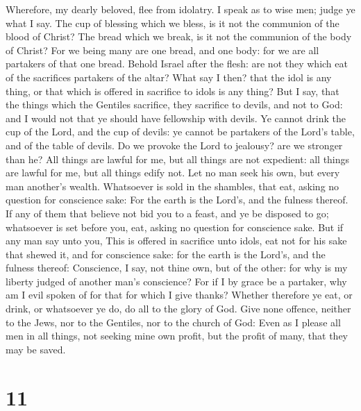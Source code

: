  Wherefore, my dearly beloved, flee from idolatry.
 I speak as to wise men; judge ye what I say. 
The cup of blessing which we bless, is it not the communion of the blood
of Christ? The bread which we break, is it not the communion of the body
of Christ?  For we being many are one bread, and one body:
for we are all partakers of that one bread.  Behold Israel
after the flesh: are not they which eat of the sacrifices partakers of
the altar?  What say I then? that the idol is any thing, or
that which is offered in sacrifice to idols is any thing? 
But I say, that the things which the Gentiles sacrifice, they sacrifice
to devils, and not to God: and I would not that ye should have
fellowship with devils.  Ye cannot drink the cup of the
Lord, and the cup of devils: ye cannot be partakers of the Lord's table,
and of the table of devils.  Do we provoke the Lord to
jealousy? are we stronger than he?  All things are lawful
for me, but all things are not expedient: all things are lawful for me,
but all things edify not.  Let no man seek his own, but
every man another's wealth.  Whatsoever is sold in the
shambles, that eat, asking no question for conscience sake:
 For the earth is the Lord's, and the fulness thereof.
 If any of them that believe not bid you to a feast, and ye
be disposed to go; whatsoever is set before you, eat, asking no question
for conscience sake.  But if any man say unto you, This is
offered in sacrifice unto idols, eat not for his sake that shewed it,
and for conscience sake: for the earth is the Lord's, and the fulness
thereof:  Conscience, I say, not thine own, but of the
other: for why is my liberty judged of another man's conscience?
 For if I by grace be a partaker, why am I evil spoken of
for that for which I give thanks?  Whether therefore ye
eat, or drink, or whatsoever ye do, do all to the glory of God.
 Give none offence, neither to the Jews, nor to the
Gentiles, nor to the church of God:  Even as I please all
men in all things, not seeking mine own profit, but the profit of many,
that they may be saved.

\hypertarget{section-10}{%
\section{11}\label{section-10}}

